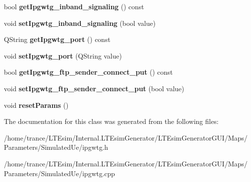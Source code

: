 \begin{DoxyCompactItemize}
\item 
bool {\bfseries get\+Ipgwtg\+\_\+inband\+\_\+signaling} () const \hypertarget{class_ipgwtg_a5a61750df10775fd63dc0768cc236c9b}{}\label{class_ipgwtg_a5a61750df10775fd63dc0768cc236c9b}

\item 
void {\bfseries set\+Ipgwtg\+\_\+inband\+\_\+signaling} (bool value)\hypertarget{class_ipgwtg_a6ad972a01432e0522fd940194d25a565}{}\label{class_ipgwtg_a6ad972a01432e0522fd940194d25a565}

\item 
Q\+String {\bfseries get\+Ipgwtg\+\_\+port} () const \hypertarget{class_ipgwtg_a6cc81fad79ad64fc333ca506ab9f502f}{}\label{class_ipgwtg_a6cc81fad79ad64fc333ca506ab9f502f}

\item 
void {\bfseries set\+Ipgwtg\+\_\+port} (Q\+String value)\hypertarget{class_ipgwtg_a38cff1ebac489798a39de859f3307583}{}\label{class_ipgwtg_a38cff1ebac489798a39de859f3307583}

\item 
bool {\bfseries get\+Ipgwtg\+\_\+ftp\+\_\+sender\+\_\+connect\+\_\+put} () const \hypertarget{class_ipgwtg_a72d96afffb776b93f1ddfb89bc94b94c}{}\label{class_ipgwtg_a72d96afffb776b93f1ddfb89bc94b94c}

\item 
void {\bfseries set\+Ipgwtg\+\_\+ftp\+\_\+sender\+\_\+connect\+\_\+put} (bool value)\hypertarget{class_ipgwtg_a042398e1cdb462226011faf2e33b81f6}{}\label{class_ipgwtg_a042398e1cdb462226011faf2e33b81f6}

\item 
void {\bfseries reset\+Params} ()\hypertarget{class_ipgwtg_ab948dc90a12144e4b4fd031a3fdb7d89}{}\label{class_ipgwtg_ab948dc90a12144e4b4fd031a3fdb7d89}

\end{DoxyCompactItemize}


The documentation for this class was generated from the following files\+:\begin{DoxyCompactItemize}
\item 
/home/trance/\+L\+T\+Esim/\+Internal.\+L\+T\+Esim\+Generator/\+L\+T\+Esim\+Generator\+G\+U\+I/\+Maps/\+Parameters/\+Simulated\+Ue/ipgwtg.\+h\item 
/home/trance/\+L\+T\+Esim/\+Internal.\+L\+T\+Esim\+Generator/\+L\+T\+Esim\+Generator\+G\+U\+I/\+Maps/\+Parameters/\+Simulated\+Ue/ipgwtg.\+cpp\end{DoxyCompactItemize}
